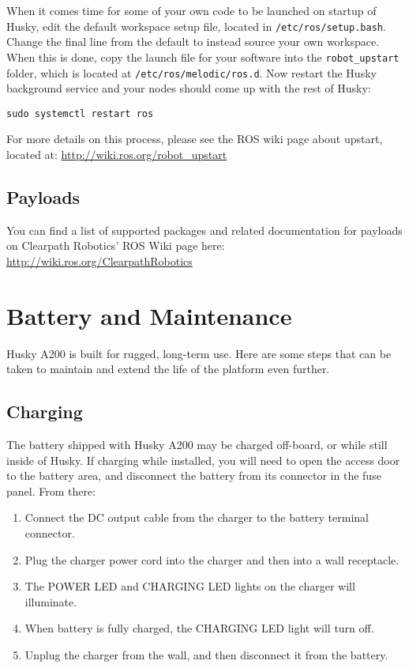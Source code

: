 \documentclass[]{clearpath-latex/clearpath-manual}
\begin{document}
When it comes time for some of your own code to be launched on startup of Husky, edit the default workspace setup file,
located in \lstinline{/etc/ros/setup.bash}. Change the final line from the default to instead source your own workspace.
When this is done, copy the launch file for your software into the \lstinline{robot_upstart} folder, which is located at
\lstinline{/etc/ros/melodic/ros.d}. Now restart the Husky background service and your nodes should come
up with the rest of Husky:

\begin{lstlisting}
sudo systemctl restart ros
\end{lstlisting}

For more details on this process, please see the ROS wiki page about upstart, located at: \url{http://wiki.ros.org/robot_upstart}

\subsection{Payloads}
You can find a list of supported packages and related documentation for payloads on Clearpath Robotics’
ROS Wiki page here: \url{http://wiki.ros.org/ClearpathRobotics}
\newpage

\section{Battery and Maintenance}
Husky A200 is built for rugged, long-term use. Here are some steps that can be
taken to maintain and extend the life of the platform even further.

\subsection{Charging}
The battery shipped with Husky A200 may be charged off-board, or while still inside of Husky.
If charging while installed, you will need to open the access door to the battery area, and
disconnect the battery from its connector in the fuse panel. From there:

\begin{enumerate}
	\item Connect the DC output cable from the charger to the battery terminal connector.
	\item Plug the charger power cord into the charger and then into a wall receptacle.
	\item The POWER LED and CHARGING LED lights on the charger will illuminate.
	\item When battery is fully charged, the CHARGING LED light will turn off.
	\item Unplug the charger from the wall, and then disconnect it from the battery.
\end{enumerate}
\end{document}
